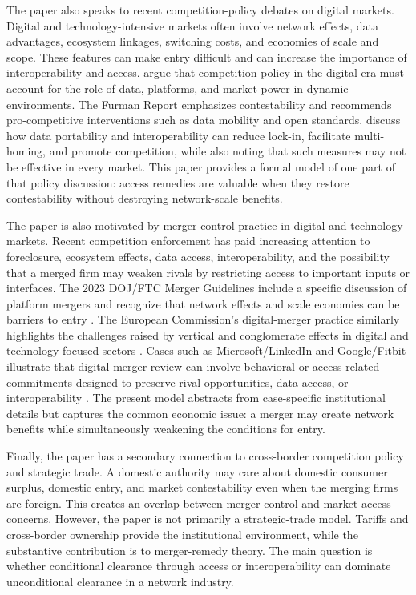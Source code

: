 \documentclass[12pt]{article}
\begin{document}
The paper also speaks to recent competition-policy debates on digital markets. Digital and technology-intensive markets often involve network effects, data advantages, ecosystem linkages, switching costs, and economies of scale and scope. These features can make entry difficult and can increase the importance of interoperability and access. \citet{CremerDeMontjoyeSchweitzer2019} argue that competition policy in the digital era must account for the role of data, platforms, and market power in dynamic environments. The Furman Report \citep{Furman2019} emphasizes contestability and recommends pro-competitive interventions such as data mobility and open standards. \citet{OECD2021Interoperability} discuss how data portability and interoperability can reduce lock-in, facilitate multi-homing, and promote competition, while also noting that such measures may not be effective in every market. This paper provides a formal model of one part of that policy discussion: access remedies are valuable when they restore contestability without destroying network-scale benefits.

The paper is also motivated by merger-control practice in digital and technology markets. Recent competition enforcement has paid increasing attention to foreclosure, ecosystem effects, data access, interoperability, and the possibility that a merged firm may weaken rivals by restricting access to important inputs or interfaces. The 2023 DOJ/FTC Merger Guidelines include a specific discussion of platform mergers and recognize that network effects and scale economies can be barriers to entry \citep{DOJFTC2023}. The European Commission's digital-merger practice similarly highlights the challenges raised by vertical and conglomerate effects in digital and technology-focused sectors \citep{EuropeanCommission2022DigitalMergers}. Cases such as Microsoft/LinkedIn and Google/Fitbit illustrate that digital merger review can involve behavioral or access-related commitments designed to preserve rival opportunities, data access, or interoperability \citep{EuropeanCommission2016MicrosoftLinkedIn,EuropeanCommission2020GoogleFitbit}. The present model abstracts from case-specific institutional details but captures the common economic issue: a merger may create network benefits while simultaneously weakening the conditions for entry.

Finally, the paper has a secondary connection to cross-border competition policy and strategic trade. A domestic authority may care about domestic consumer surplus, domestic entry, and market contestability even when the merging firms are foreign. This creates an overlap between merger control and market-access concerns. However, the paper is not primarily a strategic-trade model. Tariffs and cross-border ownership provide the institutional environment, while the substantive contribution is to merger-remedy theory. The main question is whether conditional clearance through access or interoperability can dominate unconditional clearance in a network industry.
\end{document}
